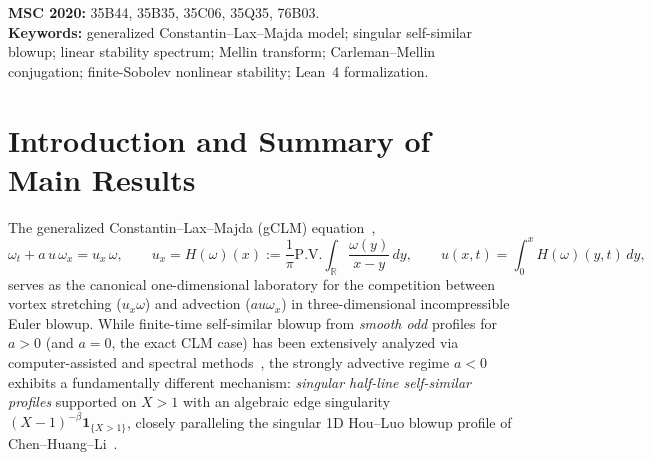 \documentclass[11pt,a4paper]{article}
\begin{document}
\begin{abstract}
Fourth, nonlinear WENO5/SSP-RK3 dynamic-rescaling DNS with exact logarithmic-kernel Hilbert integration reveals an \textbf{$L^2$-criticality selection mechanism} across $a = -1$: for $a < -1$, smooth degenerate and regularized-Branch-II initial data universally converge to Branch~I ($\gamma \to 1-a$, interior repelling stagnation point $X_* = 1+(\cos\pi\mu)^{1/\mu}$, universality spread $3.3\times 10^{-8}$) because $\bar\Omega_{\mathrm{I},a} \in L^2_{\mathrm{loc}}$ supports zero edge flux and an exact Beta-integral IBP identity $c_\omega = -1$, whereas for $-1 < a < 0$ fixed-cutoff $X > 1$ DNS locks onto Branch~II ($\beta = \frac{1}{2}, \gamma = 2$). All algebraic positivity certificates, weight-splitting identities, and bootstrap inequalities are machine-checked in Lean~4 (\texttt{lean/GclmSingularBackbone.lean}, \texttt{0~sorry}, standard axioms only), and all continuous PDE, spectral, and DNS claims are verified by four standalone Python gates (\texttt{validate/gclm\_*.py}).
\end{abstract}

\noindent\textbf{MSC 2020:} 35B44, 35B35, 35C06, 35Q35, 76B03.\\
\textbf{Keywords:} generalized Constantin--Lax--Majda model; singular self-similar blowup; linear stability spectrum; Mellin transform; Carleman--Mellin conjugation; finite-Sobolev nonlinear stability; Lean~4 formalization.

\tableofcontents
\vspace{0.5em}

\section{Introduction and Summary of Main Results}\label{sec:intro}

The generalized Constantin--Lax--Majda (gCLM) equation~\cite{CLM1985,OSW2008},
\begin{equation}\label{eq:gclm}
\omega_t + a\,u\,\omega_x = u_x\,\omega, \qquad u_x = H(\omega)(x) := \frac{1}{\pi}\mathrm{P.V.}\int_{\mathbb{R}} \frac{\omega(y)}{x-y}\,dy, \qquad u(x,t) = \int_0^x H(\omega)(y,t)\,dy,
\end{equation}
serves as the canonical one-dimensional laboratory for the competition between vortex stretching ($u_x\omega$) and advection ($a u \omega_x$) in three-dimensional incompressible Euler blowup. While finite-time self-similar blowup from \emph{smooth odd} profiles for $a > 0$ (and $a = 0$, the exact CLM case) has been extensively analyzed via computer-assisted and spectral methods~\cite{ElgindiJeong2020,ChenHouHuang2021,Lushnikov2021,Xu2026a,Xu2026b}, the strongly advective regime $a < 0$ exhibits a fundamentally different mechanism: \emph{singular half-line self-similar profiles} supported on $X > 1$ with an algebraic edge singularity $(X-1)^{-\beta}\mathbf{1}_{\{X>1\}}$, closely paralleling the singular 1D Hou--Luo blowup profile of Chen--Huang--Li~\cite{ChenHuangLi2026}.
\end{document}
